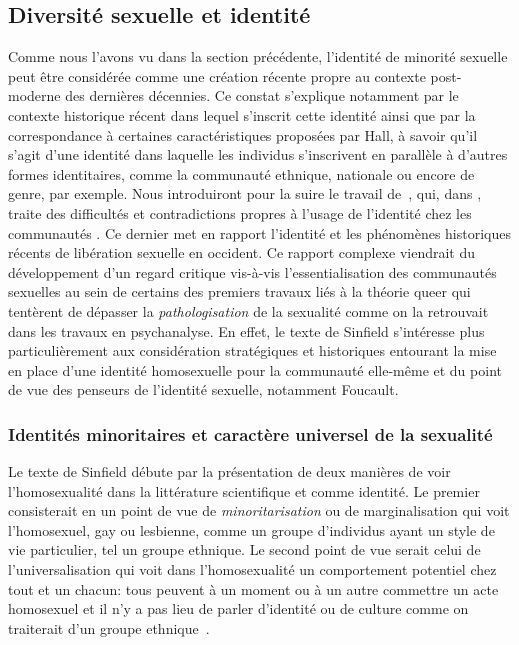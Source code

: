 \subsection{Diversité sexuelle et identité}
\label{sec:diversit_sexuelle_et_identit_} Comme nous l'avons vu dans la section précédente, l'identité de minorité sexuelle peut être considérée comme une création récente propre au contexte post-moderne des dernières décennies. 
Ce constat s'explique notamment par le contexte historique récent dans lequel s'inscrit cette identité ainsi que par la correspondance à certaines caractéristiques proposées par Hall, à savoir qu'il s'agit d'une identité dans laquelle les individus s'inscrivent en parallèle à d'autres formes identitaires, comme la communauté ethnique, nationale ou encore de genre, par exemple.
Nous introduiront pour la suire le travail de~\citet{Sinfield1996}, qui, dans , traite des difficultés et contradictions propres à l'usage de l'identité chez les communautés \lgbt{}.
Ce dernier met en rapport l'identité et les phénomènes historiques récents de libération sexuelle en occident.
Ce rapport complexe viendrait du développement d'un regard critique vis-à-vis l'essentialisation des communautés sexuelles au sein de certains des premiers travaux liés à la théorie queer qui tentèrent de dépasser la \emph{pathologisation} de la sexualité comme on la retrouvait dans les travaux en psychanalyse. 
En effet, le texte de Sinfield s'intéresse plus particulièrement aux considération stratégiques et historiques entourant la mise en place d'une identité homosexuelle pour la communauté elle-même et du point de vue des penseurs de l'identité sexuelle, notamment Foucault.

\subsubsection{Identités minoritaires et caractère universel de la sexualité}
\label{sub:minorit_s_et_universel}
Le texte de Sinfield débute par la présentation de deux manières de voir l'homosexualité dans la littérature scientifique et comme identité.
Le premier consisterait en un point de vue de \emph{minoritarisation} ou de marginalisation qui voit l'homosexuel, gay ou lesbienne, comme un groupe d'individus ayant un style de vie particulier, tel un groupe ethnique.
Le second point de vue serait celui de l'universalisation qui voit dans l'homosexualité un comportement potentiel chez tout et un chacun: tous peuvent à un moment ou à un autre commettre un acte homosexuel et il n'y a pas lieu de parler d'identité ou de culture comme on traiterait d'un groupe ethnique~\citep[271]{Sinfield1996}.

